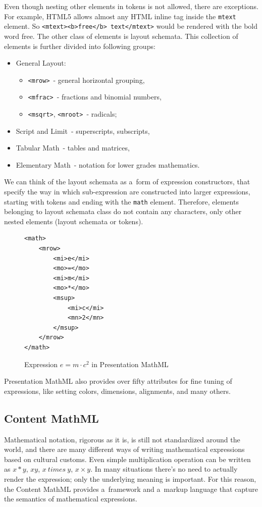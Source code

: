 \documentclass[11pt,oneside,final]{fithesis2}
\begin{document}
Even though nesting other elements in tokens is not allowed, there are exceptions. For example, HTML5 allows almost any HTML inline tag inside the \texttt{mtext} element. So \texttt{<mtext><b>free</b> text</mtext>} would be rendered with the bold word free.
The other class of elements is layout schemata. This collection of elements is further divided into following groups:
\begin{itemize}
\item General Layout:
	\begin{itemize}
	\item \texttt{<mrow>}~- general horizontal grouping,
	\item \texttt{<mfrac>}~- fractions and binomial numbers,
	\item \texttt{<msqrt>}, \texttt{<mroot>}~- radicals;
	\end{itemize}
\item Script and Limit~- superscripts, subscripts, 
\item Tabular Math~- tables and matrices,
\item Elementary Math~- notation for lower grades mathematics.
\end{itemize}
We can think of the layout schemata as a~form of expression constructors, that specify the way in which sub-expression are constructed into larger expressions, starting with tokens and ending with the \texttt{math} element. Therefore, elements belonging to layout schemata class do not contain any characters, only other nested elements (layout schemata or tokens). 

\begin{figure}[!ht]
\lstset{language=XML,frame=lines}
\begin{lstlisting}
<math>
	<mrow>
		<mi>e</mi>
		<mo>=</mo>
		<mi>m</mi>
		<mo>*</mo>
		<msup>
			<mi>c</mi>
			<mn>2</mn>
		</msup>
	</mrow>
</math>
\end{lstlisting}
\caption{Expression $e=m \cdot c^2$ in Presentation MathML}
\label{fig:presentationmathml}
\end{figure}

Presentation MathML also provides over fifty attributes for fine tuning of expressions, like setting colors, dimensions, alignments, and many others.

\subsection{Content MathML}
Mathematical notation, rigorous as it is, is still not standardized around the world, and there are many different ways of writing mathematical expressions based on cultural customs. Even simple multiplication operation can be written as $x*y$, $xy$, $x\ times\ y$, $x \times y$. In many situations there's no need to actually render the expression; only the underlying meaning is important. For this reason, the Content MathML provides a~framework and a~markup language that capture the semantics of mathematical expressions.
\end{document}
